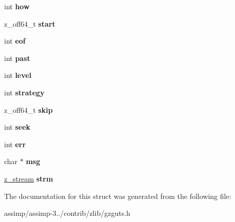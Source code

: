 \begin{DoxyCompactItemize}
\item 
\hypertarget{structgz__state_ac6e4b7db699aacd089f6d55b01483d6f}{int {\bfseries how}}\label{structgz__state_ac6e4b7db699aacd089f6d55b01483d6f}

\item 
\hypertarget{structgz__state_a0eb95c1935a32c508a1e6fc1e84c8f83}{z\+\_\+off64\+\_\+t {\bfseries start}}\label{structgz__state_a0eb95c1935a32c508a1e6fc1e84c8f83}

\item 
\hypertarget{structgz__state_ae50ffc823858bc4f909e3d9507356f92}{int {\bfseries eof}}\label{structgz__state_ae50ffc823858bc4f909e3d9507356f92}

\item 
\hypertarget{structgz__state_a65b39b950d5cabf4c174924c922aa3ff}{int {\bfseries past}}\label{structgz__state_a65b39b950d5cabf4c174924c922aa3ff}

\item 
\hypertarget{structgz__state_aaf5e13a32b8618cde112e4312d480137}{int {\bfseries level}}\label{structgz__state_aaf5e13a32b8618cde112e4312d480137}

\item 
\hypertarget{structgz__state_a2777c46311012def486c2aa720fe5203}{int {\bfseries strategy}}\label{structgz__state_a2777c46311012def486c2aa720fe5203}

\item 
\hypertarget{structgz__state_a4bc336eac6a48fd0f2645e672e5c6c13}{z\+\_\+off64\+\_\+t {\bfseries skip}}\label{structgz__state_a4bc336eac6a48fd0f2645e672e5c6c13}

\item 
\hypertarget{structgz__state_ab60b82012b8193c3f44b2e48974b9dd9}{int {\bfseries seek}}\label{structgz__state_ab60b82012b8193c3f44b2e48974b9dd9}

\item 
\hypertarget{structgz__state_aa9832eb9300c065f6572e5699ab27938}{int {\bfseries err}}\label{structgz__state_aa9832eb9300c065f6572e5699ab27938}

\item 
\hypertarget{structgz__state_a65d5a6b252dba3856ea3fa88623bdadb}{char $\ast$ {\bfseries msg}}\label{structgz__state_a65d5a6b252dba3856ea3fa88623bdadb}

\item 
\hypertarget{structgz__state_a77df647f4deba86cc8a4fa0a01a08f4e}{\hyperlink{structz__stream__s}{z\+\_\+stream} {\bfseries strm}}\label{structgz__state_a77df647f4deba86cc8a4fa0a01a08f4e}

\end{DoxyCompactItemize}


The documentation for this struct was generated from the following file\+:\begin{DoxyCompactItemize}
\item 
assimp/assimp-\/3../contrib/zlib/gzguts.\+h\end{DoxyCompactItemize}
